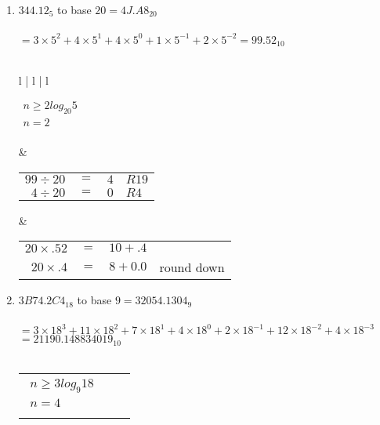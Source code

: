 \documentclass[12pt]{article}
\begin{document}
\begin{enumerate}
\begin{tabular}{l | l | l}
     \end{tabular}

     \item $344.12_{5}$ to base $20 = \boxed{4J.A8_{20}}$ \\ \\
     $ = 3 \times 5^2 + 4 \times 5^1 + 4 \times 5^0 + 1 \times 5^{-1} + 2 \times 5^{-2} = 99.52_{10}$ \\\\
     
        \begin{tabular}{l | l | l} 

        $\begin{aligned}
            n \geq 2log_{20}5 \\
            n = 2 \\
        \end{aligned}$

        &

        \begin{tabular}{r c l l}
            $99 \div 20$  & $=$ & $4$ & $R19$ \\
            $4 \div 20$  & $=$ & $0$ & $R4$  \\
        \end{tabular}

        &

        \begin{tabular}{r c l l}
            $20 \times .52$ & $=$ & $10 + .4$  & \\
            $20 \times .4$ & $=$ & $8 + 0.0$  & round down\\
        \end{tabular}
        
     \end{tabular}

     \item $3B74.2C4_{18}$ to base $9 = \boxed{32054.1304_{9}}$ \\ \\
     $ = 3 \times 18^3 + 11 \times 18^2 + 7 \times 18^1 + 4 \times 18^0 + 2 \times 18^{-1} + 12 \times 18^{-2} + 4 \times 18^{-3}$ \\
     $ = 21190.148834019_{10}$ \\\\
     
        \begin{tabular}{l | l | l} 

        $\begin{aligned}
            n \geq 3log_{9}18 \\
            n = 4 \\
        \end{aligned}$


\end{tabular}
\end{enumerate}
\end{document}
